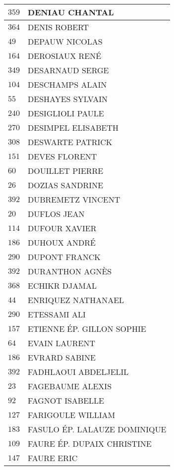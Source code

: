 \begin{xltabular}{\linewidth}{|l|X|}
    \hline
    $359$ & DENIAU CHANTAL \\
    \hline
    $364$ & DENIS ROBERT \\
    \hline
    $49$ & DEPAUW NICOLAS \\
    \hline
    $164$ & DEROSIAUX RENÉ \\
    \hline
    $349$ & DESARNAUD SERGE \\
    \hline
    $104$ & DESCHAMPS ALAIN \\
    \hline
    $55$ & DESHAYES SYLVAIN \\
    \hline
    $240$ & DESIGLIOLI PAULE \\
    \hline
    $270$ & DESIMPEL ELISABETH \\
    \hline
    $308$ & DESWARTE PATRICK \\
    \hline
    $151$ & DEVES FLORENT \\
    \hline
    $60$ & DOUILLET PIERRE \\
    \hline
    $26$ & DOZIAS SANDRINE \\
    \hline
    $392$ & DUBREMETZ VINCENT \\
    \hline
    $20$ & DUFLOS JEAN \\
    \hline
    $114$ & DUFOUR XAVIER \\
    \hline
    $186$ & DUHOUX ANDRÉ \\
    \hline
    $290$ & DUPONT FRANCK \\
    \hline
    $392$ & DURANTHON AGNÈS \\
    \hline
    $368$ & ECHIKR DJAMAL \\
    \hline
    $44$ & ENRIQUEZ NATHANAEL \\
    \hline
    $290$ & ETESSAMI ALI \\
    \hline
    $157$ & ETIENNE ÉP. GILLON SOPHIE \\
    \hline
    $64$ & EVAIN LAURENT \\
    \hline
    $186$ & EVRARD SABINE \\
    \hline
    $392$ & FADHLAOUI ABDELJELIL \\
    \hline
    $23$ & FAGEBAUME ALEXIS \\
    \hline
    $92$ & FAGNOT ISABELLE \\
    \hline
    $127$ & FARIGOULE WILLIAM \\
    \hline
    $183$ & FASULO ÉP. LALAUZE DOMINIQUE \\
    \hline
    $109$ & FAURE ÉP. DUPAIX CHRISTINE \\
    \hline
    $147$ & FAURE ERIC \\

\end{xltabular}
